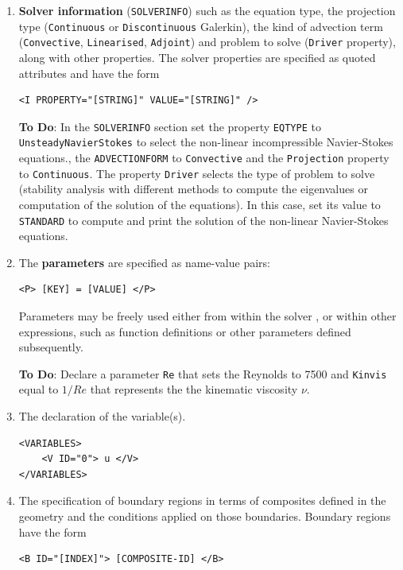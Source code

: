 \documentclass[a4paper,12pt]{article}
\begin{document}
\begin{enumerate}
\item \textbf{Solver information} (\texttt{SOLVERINFO}) such as the equation type, the projection type
(\texttt{Continuous} or \texttt{Discontinuous} Galerkin), the kind of advection term (\texttt{Convective}, \texttt{Linearised}, \texttt{Adjoint}) and problem to solve (\texttt{Driver} property), along with other properties. The solver properties are specified as quoted
attributes and have the form
\begin{verbatim}
<I PROPERTY="[STRING]" VALUE="[STRING]" />
\end{verbatim}

\textbf{To Do}: In the \texttt{SOLVERINFO} section set the
property \texttt{EQTYPE} to \texttt{UnsteadyNavierStokes}  to select the non-linear incompressible Navier-Stokes equations., the \texttt{ADVECTIONFORM} to \texttt{Convective} and the \texttt{Projection} property to \texttt{Continuous}.   The property \texttt{Driver} selects the type of problem to solve (stability analysis with different methods to compute the eigenvalues or computation of the solution of the 
equations). In this case, set its value to \texttt{STANDARD} to compute and print the solution of the non-linear Navier-Stokes equations.


\item The \textbf{parameters} are specified as name-value pairs:
\begin{verbatim}
<P> [KEY] = [VALUE] </P>
\end{verbatim}
Parameters may be freely used either from within the solver , or within other expressions, such as function definitions or
other parameters defined subsequently.

 \textbf{To Do}: Declare a parameter \texttt{Re} that sets the Reynolds to 7500 and \texttt{Kinvis} equal to $1/Re$ that represents the the kinematic viscosity $\nu$. 


\item The declaration of the variable(s).  
\begin{verbatim}
<VARIABLES>
    <V ID="0"> u </V> 
</VARIABLES>
\end{verbatim}

\item The specification of boundary regions in terms of composites defined in
the geometry and the conditions applied on those boundaries. Boundary regions
have the form
\begin{verbatim}
<B ID="[INDEX]"> [COMPOSITE-ID] </B>
\end{verbatim}



\end{enumerate}
\end{document}
